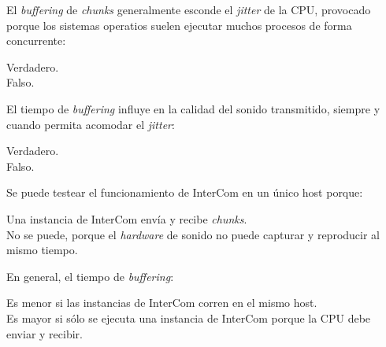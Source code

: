 \documentclass[legalpaper, 12pt, addpoints]{exam}
\begin{document}
\begin{questions}
\vspace{0.10in}

\question El \emph{buffering} de \emph{chunks} generalmente esconde el
\emph{jitter} de la CPU, provocado porque los sistemas operatios
suelen ejecutar muchos procesos de forma concurrente:

\begin{oneparchoices}
  \choice Verdadero.\\
  \choice Falso.
\end{oneparchoices}
  
\vspace{0.10in}

\question El tiempo de \emph{buffering} influye en la calidad del
sonido transmitido, siempre y cuando permita acomodar el
\emph{jitter}:

\begin{oneparchoices}
  \choice Verdadero.\\
  \choice Falso.
\end{oneparchoices}
  
\vspace{0.10in}

\question Se puede testear el funcionamiento de InterCom en un único host porque:

\begin{oneparchoices}
  \choice Una instancia de InterCom envía y recibe \emph{chunks}.\\
  \choice No se puede, porque el \emph{hardware} de sonido no puede capturar y reproducir al mismo tiempo.
\end{oneparchoices}
  
\vspace{0.10in}

\question En general, el tiempo de \emph{buffering}:

\begin{oneparchoices}
  \choice Es menor si las instancias de InterCom corren en el mismo host.\\
  \choice Es mayor si sólo se ejecuta una instancia de InterCom porque la CPU debe enviar y recibir.
\end{oneparchoices}
  
\vspace{0.10in}


  

\end{questions}
\end{document}

